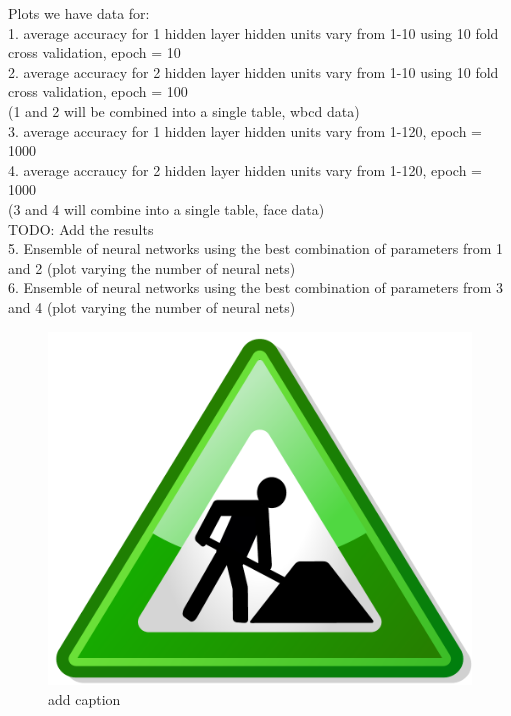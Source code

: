 Plots we have data for:\\
1. average accuracy for 1 hidden layer hidden units vary from 1-10 using 10 fold cross validation, epoch = 10\\
2. average accuracy for 2 hidden layer hidden units vary from 1-10 using 10 fold cross validation, epoch = 100\\
(1 and 2 will be combined into a single table, wbcd data)\\
3. average accuracy for 1 hidden layer hidden units vary from 1-120, epoch = 1000\\
4. average accraucy for 2 hidden layer hidden units vary from 1-120, epoch = 1000\\
(3 and 4 will combine into a single table, face data)\\

TODO: Add the results\\
5. Ensemble of neural networks using the best combination of parameters from 1 and 2 (plot varying the number of neural nets)\\
6. Ensemble of neural networks using the best combination of parameters from 3 and 4 (plot varying the number of neural nets)\\
 
\begin{figure}[t]

\centering
\includegraphics[width=0.95\columnwidth]{figs/tocome}
\caption{add caption}
\label{fig:tocome1}

\end{figure}

